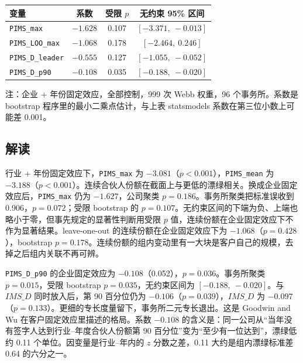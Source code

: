 \documentclass[11pt]{article}
\begin{document}
\begin{center}
\begin{threeparttable}
\caption{事务所聚类的受限 wild cluster bootstrap}
\label{tab:wcb}
\begin{tabular}{lccc}
\toprule
变量 & 系数 & 受限 \(p\) & 无约束 95\% 区间 \\
\midrule
\texttt{PIMS\_max} & \(-1.628\) & 0.107 & \([-3.371,\ -0.013]\) \\
\texttt{PIMS\_LOO\_max} & \(-1.068\) & 0.178 & \([-2.464,\ 0.246]\) \\
\texttt{PIMS\_D\_leader} & \(-0.555\) & 0.127 & \([-1.055,\ -0.052]\) \\
\texttt{PIMS\_D\_p90} & \(-0.108\) & 0.035 & \([-0.188,\ -0.020]\) \\
\bottomrule
\end{tabular}
\begin{tablenotes}\footnotesize
\item 注：企业 + 年份固定效应，全部控制，999 次 Webb 权重，96 个事务所。系数是 bootstrap 程序里的最小二乘点估计，与上表 statsmodels 系数在第三位小数上可能差 0.001。
\end{tablenotes}
\end{threeparttable}
\end{center}

\subsection{解读}

行业 + 年份固定效应下，\texttt{PIMS\_max} 为 \(-3.081\)（\(p<0.001\)），\texttt{PIMS\_mean} 为 \(-3.188\)（\(p<0.001\)）。连续合伙人份额在截面上与更低的漂绿相关。换成企业固定效应后，\texttt{PIMS\_max} 仍为 \(-1.627\)，公司聚类 \(p=0.186\)。事务所聚类把标准误收到 0.906，\(p=0.072\)；受限 bootstrap 的 \(p=0.107\)。无约束区间的下端为负、上端也略小于零，但事先规定的显著性判断用受限 \(p\) 值，连续份额在企业固定效应下不作为显著结果。leave-one-out 的连续份额在企业固定效应下为 \(-1.068\)（\(p=0.428\)），bootstrap \(p=0.178\)。连续份额的组内变动里有一大块是客户自己的规模，去掉之后组内关联不再可辨。

\texttt{PIMS\_D\_p90} 的企业固定效应为 \(-0.108\)（0.052），\(p=0.036\)。事务所聚类 \(p=0.015\)，受限 bootstrap \(p=0.035\)，无约束区间为 \([-0.188,\ -0.020]\)。与 \(IMS\_D\) 同时放入后，第 90 百分位仍为 \(-0.106\)（\(p=0.039\)），\(IMS\_D\) 为 \(-0.097\)（\(p=0.133\)）。更细的专长度量留下，事务所二元专长退出。这是 Goodwin and Wu 在客户固定效应里描述的格局。系数 \(-0.108\) 的含义是：同一公司从``当年没有签字人达到行业--年度合伙人份额第 90 百分位''变为``至少有一位达到''，漂绿低约 0.11 个单位。因变量是行业--年内的 \(z\) 分数之差，0.11 大约是组内漂绿标准差 0.64 的六分之一。
\end{document}
